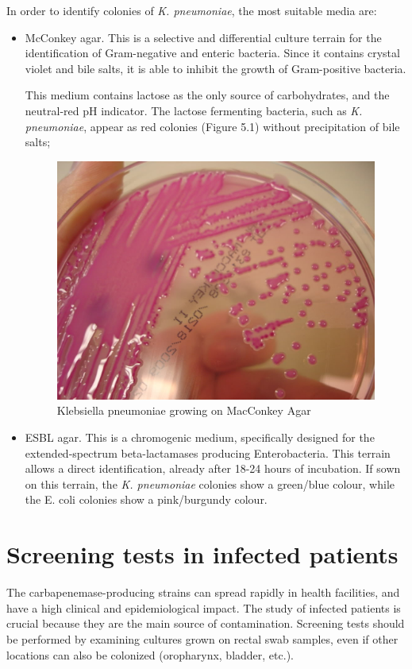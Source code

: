 \documentclass[11pt]{report}
\begin{document}
In order to identify colonies of \emph{K. pneumoniae}, the most suitable media are:
\begin{itemize}
\item McConkey agar.
This is a selective and differential culture terrain for the identification of Gram-negative and enteric bacteria.
Since it contains crystal violet and bile salts, it is able to inhibit the growth of Gram-positive bacteria. 

This medium contains lactose as the only source of carbohydrates, and the neutral-red pH indicator.
The lactose fermenting bacteria, such as \emph{K. pneumoniae}, appear as red colonies (Figure 5.1) without precipitation of bile salts;

\begin{figure}[htp]
\centering
\includegraphics[scale=0.250]{immagini gamalero/KlebsiellaMAC.jpg}
\caption{Klebsiella pneumoniae growing on MacConkey Agar}
\label{}
\end{figure}

\clearpage
\item ESBL agar.
This is a chromogenic medium, specifically designed for the extended-spectrum beta-lactamases producing Enterobacteria. This terrain allows a direct identification, already after 18-24 hours of incubation.
If sown on this terrain, the \emph{K. pneumoniae} colonies show a green/blue colour, while the E. coli colonies show a pink/burgundy colour.
\end{itemize}

\section{Screening tests in infected patients}
The carbapenemase-producing strains can spread rapidly in health facilities, and have a high clinical and epidemiological impact.
The study of infected patients is crucial because they are the main source of contamination.
Screening tests should be performed by examining cultures grown on rectal swab samples, even if other locations can also be colonized (oropharynx, bladder, etc.).
\end{document}
